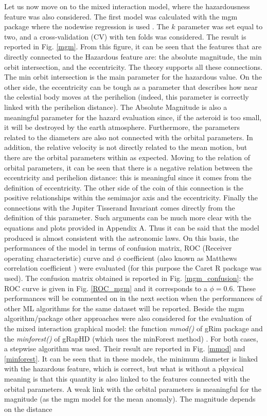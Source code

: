 \documentclass[12pt,%
               a4paper,%
               oneside,openany,%
               titlepage,%
               headinclude,footinclude,%
               BCOR5mm,%
               cleardoublepage=empty,%
               tablecaptionabove,%
               floatperchapter,
               ]{scrreprt}                 %
\begin{document}
Let us now move on to the mixed interaction model, where the hazardousness feature was also considered.  The first model was calculated with the mgm package  \cite{mgm,haslbeck2015mgm} where the nodewise regression is used \cite{meinshausen2006high}. The $k$ parameter was set equal to two, and a cross-validation (CV) with ten folds was considered. The result is reported in Fig. \ref{mgm}. From this figure, it can be seen that the features that are directly connected to the Hazardous feature are: the absolute magnitude, the min orbit intersection, and the eccentricity.  The theory supports all these connections. The min orbit intersection is the main parameter for the hazardous value. On the other side, the eccentricity can be tough as a parameter that describes how near the celestial body moves at the perihelion (indeed, this parameter is correctly linked with the perihelion distance). The Absolute Magnitude is also a meaningful parameter for the hazard evaluation since, if the asteroid is too small, it will be destroyed by the earth atmosphere.  Furthermore, the parameters related to the diameters are also not connected with the orbital parameters. In addition, the relative velocity is not directly related to the mean motion, but there are the orbital parameters within as expected. Moving to the relation of orbital parameters, it can be seen that there is a negative relation between the eccentricity and perihelion distance: this is meaningful since it comes from the definition of eccentricity. The other side of the coin of this connection is the positive relationships within the semimajor axis and the eccentricity. Finally the connections with the Jupiter Tisserand Invariant comes directly from the definition of this parameter. Such arguments can be much more clear with the equations and plots provided in Appendix A. Thus it can be said that the model produced is almost consistent with the astronomic laws. On this basis, the performances of the model in terms of confusion matrix, ROC (Receiver operating characteristic) curve and $\phi$ coefficient (also known as Matthews correlation coefficient ) were evaluated (for this purpose the Caret R package \cite{kuhn2008building,caret} was used). The confusion matrix obtained is reported in Fig. \ref{mgm_confusion}: the ROC curve is given in Fig. \ref{ROC_mgm} and it corresponds to a $\phi=0.6$. These performances will be commented on in the next section when the performances of other ML algorithms for the same dataset will be reported. Beside the mgm algorithm/package other approaches were also considered for the evaluation of the mixed interaction graphical model: the function \textit{mmod()} of gRim package \cite{hojsgaard2012graphical} and the \textit{minforest()} of gRapHD (which uses the minForest method) \cite{de2009high}. For both cases, a stepwise algorithm was used.  Their result are reported in Fig. \ref{mmod} and \ref{minforest}. It can be seen that in these models, the minimum diameter is linked with the hazardous feature, which is correct, but what is without a physical meaning is that this quantity is also linked to the features connected with the orbital parameters. A weak link with the orbital parameters is meaningful for the magnitude (as the mgm model for the mean anomaly).  The magnitude depends on the distance 
\end{document}
